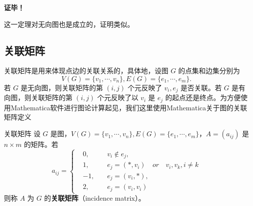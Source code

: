 \textbf{证毕！}

这一定理对无向图也是成立的，证明类似。
\subsection{关联矩阵}

关联矩阵是用来体现点边的关联关系的，具体地，设图 $G$ 的点集和边集分别为 
\begin{equation}\label{eq_RepGra_1}
V(G)=\{v_1,\cdots,v_n\},E(G)=\{e_1,\cdots,e_m\}.~
\end{equation}
若 $G$ 是无向图，则关联矩阵的第 $(i,j)$ 个元反映了 $v_i,e_j$ 是否关联。若 $G$ 是有向图，则关联矩阵的第 $(i,j)$ 个元反映了以 $v_i$ 是 $e_j$ 的起点还是终点。为方便使用Mathematica软件进行图论计算起见，我们这里使用Mathematica关于图的关联矩阵定义
\begin{definition}{关联矩阵}\label{def_RepGra_2}
设 $G$ 是图，$V(G)=\{v_1,\cdots,v_n\},E(G)=\{e_1,\cdots,e_m\}$，$A=(a_{ij})$ 是 $n\times m$ 的矩阵。若
\begin{equation}
a_{ij}=\left\{\begin{aligned}
&0,\quad &&v_i\notin e_j,\\
&1, &&e_j=(*,v_i) \quad or\quad {v_i,v_k},i\neq k\\
&-1, &&e_j=(v_i,*) ,\\
&2, &&e_j=(v_i,v_i)
\end{aligned}\right.~
\end{equation}
则称 $A$ 为 $G$ 的\textbf{关联矩阵}（incidence matrix）。
\end{definition}

